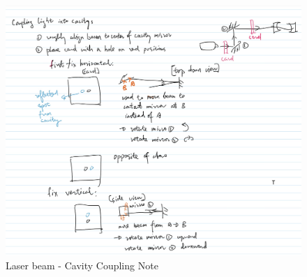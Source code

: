 \documentclass[12pt]{report}
\begin{document}
\begin{figure}[H]
    \centering
    \includegraphics[width=\textwidth]{laserCavityCoupling.jpg}
    \caption{Laser beam - Cavity Coupling Note}
    \label{fig:laserCavityCoupling}
\end{figure}










\end{document}
